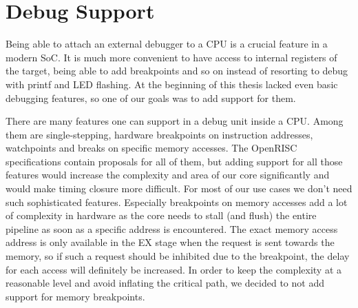 

\chapter{Debug Support}

\label{chapter:debug}

Being able to attach an external debugger to a \gls{CPU} is a crucial feature
in a modern \gls{SoC}. It is much more convenient to have access to internal
registers of the target, being able to add breakpoints and so on instead of
resorting to debug with printf and \gls{LED} flashing.
At the beginning of this thesis \orion lacked even basic debugging features, so
one of our goals was to add support for them.

There are many features one can support in a debug unit inside a \gls{CPU}. Among
them are single-stepping, hardware breakpoints on instruction addresses,
watchpoints and breaks on specific memory accesses. The OpenRISC specifications
\cite{OR1KSPEC} contain proposals for all of them, but adding support for all
those features would increase the complexity and area of our core
significantly and would make timing closure more difficult. For most of our
use cases we don't need such sophisticated features.
Especially breakpoints on memory accesses add a lot of complexity in hardware as
the core needs to stall (and flush) the entire pipeline as soon as a specific
address is encountered. The exact memory access address is only available in the
\gls{EX} stage when the request is sent towards the memory, so if such a request
should be inhibited due to the breakpoint, the delay for each access will
definitely be increased. In order to keep the complexity at a reasonable level
and avoid inflating the critical path, we decided to not add support for memory
breakpoints.

